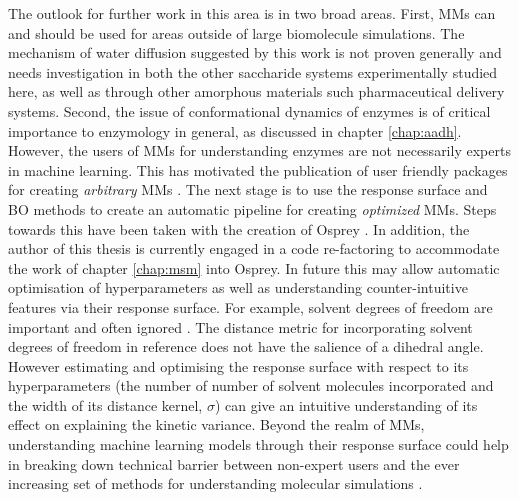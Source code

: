 The outlook for further work in this area is in two broad areas.  First, MMs can and should be used for areas outside of large biomolecule simulations. The mechanism of water diffusion suggested by this work is not proven generally and needs investigation in both the other saccharide systems experimentally studied here, as well as through other amorphous materials such pharmaceutical delivery systems\cite{hancockCharacteristicsSignificanceAmorphous1997}. Second, the issue of conformational dynamics of enzymes is of critical importance to enzymology in general, as discussed in chapter \ref{chap:aadh}.  However, the users of MMs for understanding enzymes are not necessarily experts in machine learning. This has motivated the publication of user friendly packages for creating \emph{arbitrary} MMs \cite{schererPyEMMASoftwarePackage2015a,beauchampMSMBuilder2ModelingConformational2011}.  The next stage is to use the response surface and BO methods to create an automatic  pipeline for creating \emph{optimized} MMs. Steps towards this have been taken with the creation of Osprey \cite{mcgibbonOspreyHyperparameterOptimization2016}.  In addition, the author of this thesis is currently engaged in a code re-factoring to accommodate the work of chapter \ref{chap:msm} into Osprey. In future this may allow automatic optimisation of hyperparameters as well as understanding counter-intuitive features via their response surface. For example, solvent degrees of freedom are important and often ignored \cite{guBuildingMarkovState2013}. The distance metric for incorporating solvent degrees of freedom in reference \cite{guBuildingMarkovState2013} does not have the salience of a dihedral angle. However estimating and optimising the response surface with respect to its hyperparameters (the number of number of solvent molecules incorporated and the width of its distance kernel, $\sigma$) can give an intuitive understanding of its effect on explaining the kinetic variance. Beyond the realm of MMs, understanding machine learning models through their response surface could help in breaking down technical barrier between non-expert users and the ever increasing set of methods for understanding molecular simulations \cite{noeMachineLearningMolecular2020}.

